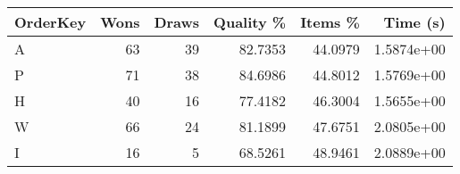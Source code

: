 \begin{tabular}{lrrrrr}
\hline
OrderKey & Wons & Draws & Quality \% & Items \% & Time (s)   \\
\hline
A        & 63   & 39    & 82.7353    & 44.0979  & 1.5874e+00 \\
P        & 71   & 38    & 84.6986    & 44.8012  & 1.5769e+00 \\
H        & 40   & 16    & 77.4182    & 46.3004  & 1.5655e+00 \\
W        & 66   & 24    & 81.1899    & 47.6751  & 2.0805e+00 \\
I        & 16   & 5     & 68.5261    & 48.9461  & 2.0889e+00 \\
\hline
\end{tabular}